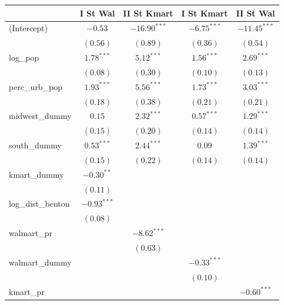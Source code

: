 \documentclass{article}
\theoremstyle{definition}
\begin{document}
\begin{table}[h]
\begin{center}
\begin{tabular}{l c c c c}
\hline
 & I St Wal & II St Kmart & I St Kmart & II St Wal \\
\hline
(Intercept)       & $-0.53$       & $-16.90^{***}$ & $-6.75^{***}$ & $-11.45^{***}$ \\
                  & $(0.56)$      & $(0.89)$       & $(0.36)$      & $(0.54)$       \\
log\_pop          & $1.78^{***}$  & $5.12^{***}$   & $1.56^{***}$  & $2.69^{***}$   \\
                  & $(0.08)$      & $(0.30)$       & $(0.10)$      & $(0.13)$       \\
perc\_urb\_pop    & $1.93^{***}$  & $5.56^{***}$   & $1.73^{***}$  & $3.03^{***}$   \\
                  & $(0.18)$      & $(0.38)$       & $(0.21)$      & $(0.21)$       \\
midwest\_dummy    & $0.15$        & $2.32^{***}$   & $0.57^{***}$  & $1.29^{***}$   \\
                  & $(0.15)$      & $(0.20)$       & $(0.14)$      & $(0.14)$       \\
south\_dummy      & $0.53^{***}$  & $2.44^{***}$   & $0.09$        & $1.39^{***}$   \\
                  & $(0.15)$      & $(0.22)$       & $(0.14)$      & $(0.14)$       \\
kmart\_dummy      & $-0.30^{**}$  &                &               &                \\
                  & $(0.11)$      &                &               &                \\
log\_dist\_benton & $-0.93^{***}$ &                &               &                \\
                  & $(0.08)$      &                &               &                \\
walmart\_pr      &               & $-8.62^{***}$  &               &                \\
                  &               & $(0.63)$       &               &                \\
walmart\_dummy   &               &                & $-0.33^{***}$ &                \\
                  &               &                & $(0.10)$      &                \\
kmart\_pr         &               &                &               & $-0.60^{***}$  \\

\end{tabular}
\end{center}
\end{table}
\end{document}
